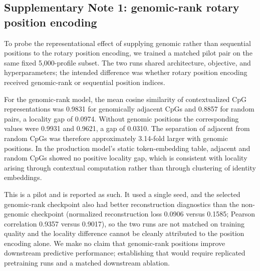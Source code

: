 \clearpage
\subsection*{Supplementary Note 1: genomic-rank rotary position encoding}

To probe the representational effect of supplying genomic rather than sequential positions to
the rotary position encoding, we trained a matched pilot pair on the same fixed 5,000-profile
subset. The two runs shared architecture, objective, and hyperparameters; the intended
difference was whether rotary position encoding received genomic-rank or sequential position
indices.

For the genomic-rank model, the mean cosine similarity of contextualized CpG representations
was 0.9831 for genomically adjacent CpGs and 0.8857 for random pairs, a locality gap of 0.0974.
Without genomic positions the corresponding values were 0.9931 and 0.9621, a gap of 0.0310. The
separation of adjacent from random CpGs was therefore approximately 3.14-fold larger with
genomic positions. In the production model's static token-embedding table, adjacent and random
CpGs showed no positive locality gap, which is consistent with locality arising through
contextual computation rather than through clustering of identity embeddings.

This is a pilot and is reported as such. It used a single seed, and the selected genomic-rank
checkpoint also had better reconstruction diagnostics than the non-genomic checkpoint
(normalized reconstruction loss 0.0906 versus 0.1585; Pearson correlation 0.9357 versus
0.9017), so the two runs are not matched on training quality and the locality difference cannot
be cleanly attributed to the position encoding alone. We make no claim that genomic-rank
positions improve downstream predictive performance; establishing that would require replicated
pretraining runs and a matched downstream ablation.
